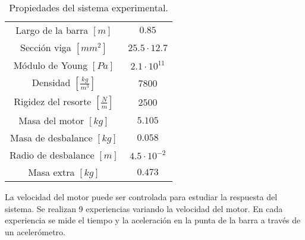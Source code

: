 \documentclass[letterpaper,11pt]{article} %
\begin{document}
\begin{table}[hbt]
    \centering
    \begin{tabular}{c|c}
         Largo de la barra $[m]$&  $0.85$\\
         Sección viga $[mm^2]$&$25.5\cdot12.7$ \\
         Módulo de Young $[Pa]$& $2.1\cdot10^{11}$\\
         Densidad $[\frac{kg}{m^3}]$&$7800$ \\
         Rigidez del resorte $[\frac{N}{m}]$& $2500$\\
         Masa del motor $[kg]$&$5.105$  \\
     	 Masa de desbalance $[kg]$&$0.058$\\
     	 Radio de desbalance $[m]$&$4.5\cdot10^{-2}$\\
     	 Masa extra $[kg]$&$0.473$
    \end{tabular}
    \caption{Propiedades del sistema experimental.}
    \label{tab:tablita}
\end{table}

La velocidad del motor puede ser controlada para estudiar la respuesta del sistema. Se realizan 9 experiencias variando la velocidad del motor. En cada experiencia se mide el tiempo y la aceleración en la punta de la barra a través de un acelerómetro.
\end{document}
